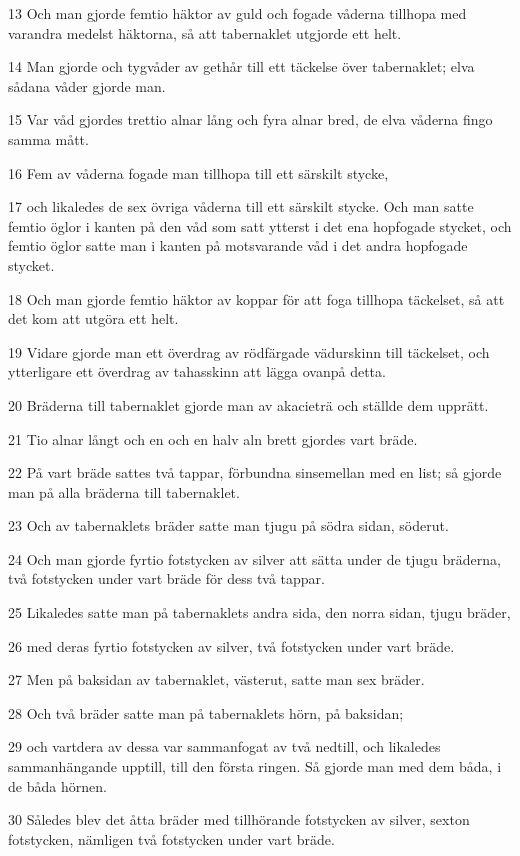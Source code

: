 \par 13 Och man gjorde femtio häktor av guld och fogade våderna tillhopa med varandra medelst häktorna, så att tabernaklet utgjorde ett helt.
\par 14 Man gjorde och tygvåder av gethår till ett täckelse över tabernaklet; elva sådana våder gjorde man.
\par 15 Var våd gjordes trettio alnar lång och fyra alnar bred, de elva våderna fingo samma mått.
\par 16 Fem av våderna fogade man tillhopa till ett särskilt stycke,
\par 17 och likaledes de sex övriga våderna till ett särskilt stycke. Och man satte femtio öglor i kanten på den våd som satt ytterst i det ena hopfogade stycket, och femtio öglor satte man i kanten på motsvarande våd i det andra hopfogade stycket.
\par 18 Och man gjorde femtio häktor av koppar för att foga tillhopa täckelset, så att det kom att utgöra ett helt.
\par 19 Vidare gjorde man ett överdrag av rödfärgade vädurskinn till täckelset, och ytterligare ett överdrag av tahasskinn att lägga ovanpå detta.
\par 20 Bräderna till tabernaklet gjorde man av akacieträ och ställde dem upprätt.
\par 21 Tio alnar långt och en och en halv aln brett gjordes vart bräde.
\par 22 På vart bräde sattes två tappar, förbundna sinsemellan med en list; så gjorde man på alla bräderna till tabernaklet.
\par 23 Och av tabernaklets bräder satte man tjugu på södra sidan, söderut.
\par 24 Och man gjorde fyrtio fotstycken av silver att sätta under de tjugu bräderna, två fotstycken under vart bräde för dess två tappar.
\par 25 Likaledes satte man på tabernaklets andra sida, den norra sidan, tjugu bräder,
\par 26 med deras fyrtio fotstycken av silver, två fotstycken under vart bräde.
\par 27 Men på baksidan av tabernaklet, västerut, satte man sex bräder.
\par 28 Och två bräder satte man på tabernaklets hörn, på baksidan;
\par 29 och vartdera av dessa var sammanfogat av två nedtill, och likaledes sammanhängande upptill, till den första ringen. Så gjorde man med dem båda, i de båda hörnen.
\par 30 Således blev det åtta bräder med tillhörande fotstycken av silver, sexton fotstycken, nämligen två fotstycken under vart bräde.
